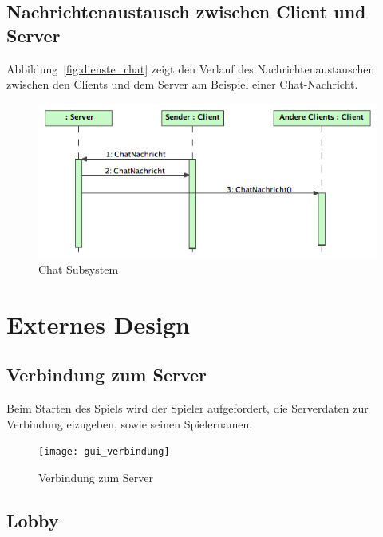 \documentclass[12pt,halfparskip]{scrartcl}
\begin{document}
\subsection{Nachrichtenaustausch zwischen Client und Server} %
\label{sub:nachrichtenaustausch_zwischen_client_und_server}
Abbildung~\vref{fig:dienste_chat} zeigt den Verlauf des Nachrichtenaustauschen zwischen den Clients und dem Server am Beispiel einer Chat-Nachricht.
\begin{figure}[h]
	\centering
	\includegraphics[width=\textwidth]{dienste_chat}
	\caption{Chat Subsystem}
	\label{fig:dienste_chat}
\end{figure}
\clearpage

\section{Externes Design} %
\label{externes_design}

\subsection{Verbindung zum Server} %
\label{externes_design_verbindung}

Beim Starten des Spiels wird der Spieler aufgefordert, die Serverdaten zur Verbindung eizugeben, sowie seinen Spielernamen.

\begin{figure}[h]
	\centering
	\texttt{[image: gui\_verbindung]}
	\caption{Verbindung zum Server}
	\label{fig:gui_verbindung}
\end{figure}

\clearpage

\subsection{Lobby} %
\label{externes_design_lobby}
\end{document}
